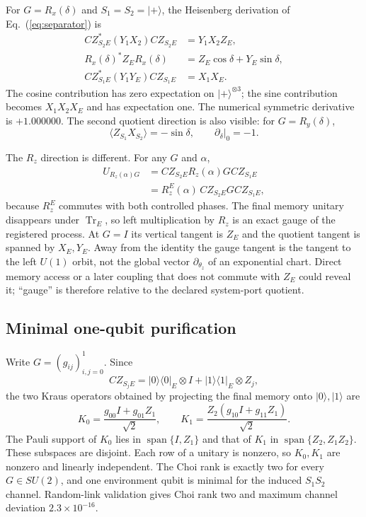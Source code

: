 \documentclass[aps,prl,reprint,superscriptaddress,nofootinbib]{revtex4-2}
\newcommand{\Tr}{\operatorname{Tr}}
\begin{document}
For $G=R_x(\delta)$ and $S_1=S_2=|+\rangle$, the Heisenberg derivation of Eq.~(\ref{eq:separator}) is
\begin{align}
 CZ_{S_2E}^*(Y_1X_2)CZ_{S_2E}&=Y_1X_2Z_E,\nonumber\\
 R_x(\delta)^*Z_ER_x(\delta)&=Z_E\cos\delta+Y_E\sin\delta,\nonumber\\
 CZ_{S_1E}^*(Y_1Y_E)CZ_{S_1E}&=X_1X_E.
 \label{eq:separator-heis}
\end{align}
The cosine contribution has zero expectation on $|+\rangle^{\otimes3}$; the sine contribution becomes $X_1X_2X_E$ and has expectation one.  The numerical symmetric derivative is $+1.000000$.  The second quotient direction is also visible: for $G=R_y(\delta)$,
\begin{equation}
 \langle Z_{S_1}X_{S_2}\rangle=-\sin\delta,
 \qquad \left.\partial_\delta\right|_0=-1.
 \label{eq:separator-y}
\end{equation}

The $R_z$ direction is different.  For any $G$ and $\alpha$,
\begin{align}
 U_{R_z(\alpha)G}
 &=CZ_{S_2E}R_z(\alpha)G CZ_{S_1E}\nonumber\\
 &=R_z^E(\alpha)\,CZ_{S_2E}G CZ_{S_1E},
 \label{eq:left-gauge}
\end{align}
because $R_z^E$ commutes with both controlled phases.  The final memory unitary disappears under $\Tr_E$, so left multiplication by $R_z$ is an exact gauge of the registered process.  At $G=I$ its vertical tangent is $Z_E$ and the quotient tangent is spanned by $X_E,Y_E$.  Away from the identity the gauge tangent is the tangent to the left $U(1)$ orbit, not the global vector $\partial_{\theta_z}$ of an exponential chart.  Direct memory access or a later coupling that does not commute with $Z_E$ could reveal it; ``gauge'' is therefore relative to the declared system-port quotient.

\subsection{Minimal one-qubit purification}

Write $G=(g_{ij})_{i,j=0}^1$.  Since
\begin{equation}
 CZ_{S_jE}=|0\rangle\!\langle0|_E\otimes I
 +|1\rangle\!\langle1|_E\otimes Z_j,
 \label{eq:CZ-memory}
\end{equation}
the two Kraus operators obtained by projecting the final memory onto $|0\rangle,|1\rangle$ are
\begin{equation}
 K_0=\frac{g_{00}I+g_{01}Z_1}{\sqrt2},
 \qquad
 K_1=\frac{Z_2(g_{10}I+g_{11}Z_1)}{\sqrt2}.
 \label{eq:two-kraus}
\end{equation}
The Pauli support of $K_0$ lies in $\operatorname{span}\{I,Z_1\}$ and that of $K_1$ in $\operatorname{span}\{Z_2,Z_1Z_2\}$.  These subspaces are disjoint.  Each row of a unitary is nonzero, so $K_0,K_1$ are nonzero and linearly independent.  The Choi rank is exactly two for every $G\in SU(2)$, and one environment qubit is minimal for the induced $S_1S_2$ channel.  Random-link validation gives Choi rank two and maximum channel deviation $2.3\times10^{-16}$.
\end{document}
